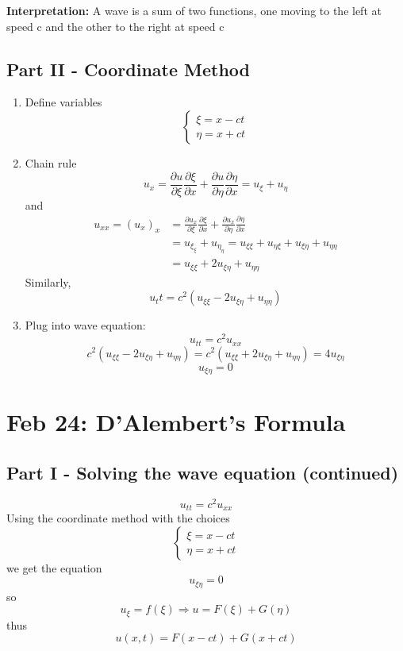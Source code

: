 \documentclass[12pt]{article}
\begin{document}
\textbf{Interpretation:} A wave is a sum of two functions, one moving to the left at speed c and the other to the right at speed c 

\subsection*{Part II - Coordinate Method}
\begin{enumerate}
    \item Define variables 
    \[\begin{cases}
        \xi  =x - ct \\
        \eta = x + ct
    \end{cases}\]
    \item Chain rule 
    \[u_x = \frac{\partial u}{\partial \xi} \frac{\partial \xi}{\partial x} + \frac{\partial u}{\partial \eta} \frac{\partial \eta}{\partial x} = u_\xi + u_\eta\]
    and 
    \begin{align*}
        u_{xx} = (u_x)_x &= \frac{\partial u_x}{\partial \xi} \frac{\partial \xi}{\partial x} + \frac{\partial u_x}{\partial \eta} \frac{\partial \eta}{\partial x} \\
        &= u_{\xi_\xi} + u_{\eta_\eta} = u_{\xi \xi} + u_{\eta \xi} + u_{\xi \eta} + u_{\eta \eta}\\
        &= u_{\xi \xi} + 2u_{\xi \eta} + u_{\eta \eta}
    \end{align*}
    Similarly, 
    \[u_tt = c^2 (u_{\xi \xi} - 2u_{\xi \eta} + u_{\eta \eta})\]

    \item Plug into wave equation:
    \[u_{tt} = c^2 u_{xx}\]
    \[c^2 (u_{\xi \xi} - 2u_{\xi \eta} + u_{\eta \eta}) = c^2( u_{\xi \xi} + 2u_{\xi \eta} + u_{\eta \eta}) = 4u_{\xi \eta}\]
    \[\boxed{u_{\xi \eta} = 0}\]
\end{enumerate}

\section{Feb 24: D'Alembert's Formula}
\subsection*{Part I - Solving the wave equation (continued)}
\[u_{tt} = c^2 u_{xx}\]
Using the coordinate method with the choices 
\[\begin{cases}
    \xi = x - ct\\
    \eta = x + ct
\end{cases}\]
we get the equation 
\[u_{\xi \eta} = 0\]
so
\[u_\xi = f(\xi) \Longrightarrow u = F(\xi) + G(\eta)\]
thus 
\[\boxed{u(x, t) = F(x - ct) + G(x + ct)}\]
\end{document}
